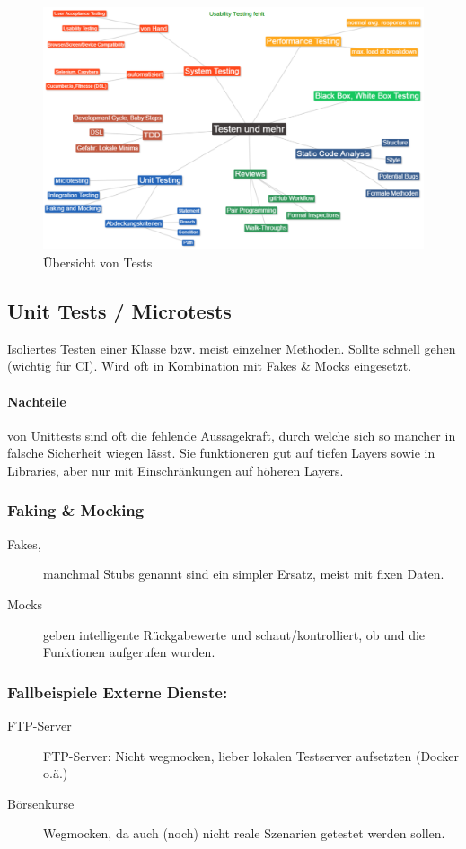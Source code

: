 \begin{figure}[h!]
	\centering
	\includegraphics[width=0.7\linewidth]{img/testing_overview}
	\caption{Übersicht von Tests}
	\label{fig:testingoverview}
\end{figure}


\subsection{Unit Tests / Microtests}

Isoliertes Testen einer Klasse bzw. meist einzelner Methoden. Sollte schnell gehen (wichtig für CI). Wird oft in Kombination mit Fakes \& Mocks eingesetzt.

\paragraph{Nachteile} von Unittests sind oft die fehlende Aussagekraft, durch welche sich so mancher in falsche Sicherheit wiegen lässt. Sie funktioneren gut auf tiefen Layers sowie in Libraries, aber nur mit Einschränkungen auf höheren Layers.

\subsubsection{Faking \& Mocking}
\begin{description}
	\item[Fakes,] manchmal Stubs genannt sind ein simpler Ersatz, meist mit fixen Daten.
	\item[Mocks] geben intelligente Rückgabewerte und schaut/kontrolliert, ob und die Funktionen aufgerufen wurden.
\end{description}

\subsubsection{Fallbeispiele Externe Dienste:}
\begin{description}
	\item[FTP-Server] FTP-Server: Nicht wegmocken, lieber lokalen Testserver aufsetzten (Docker o.ä.)
	\item[Börsenkurse] Wegmocken, da auch (noch) nicht reale Szenarien getestet werden sollen.
\end{description}

